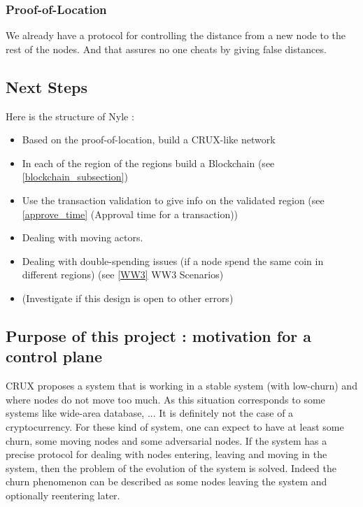 \documentclass[a4paper,11pt,oneside]{report}
\begin{document}
\subsubsection{Proof-of-Location} We already have a protocol for controlling
the distance from a new node to the rest of the nodes. And that assures no one
cheats by giving false distances. 


\subsection{Next Steps} Here is the structure of Nyle :

\begin{itemize} 
\item Based on the proof-of-location, build a CRUX-like network
\item In each of the region of the regions build a Blockchain 
(see \ref{blockchain_subsection})
\item Use the transaction validation to  give info on the validated region
(see \ref{approve_time} (Approval time for a transaction))
\item Dealing with moving actors.
\item Dealing with double-spending issues
(if a node spend the same coin in different regions) 
(see \ref{WW3} WW3 Scenarios) 
\item (Investigate if this design is open to other errors)
\end{itemize}

\subsection{Purpose of this project : motivation for a control plane}

CRUX proposes a system that is working in a stable system (with low-churn) and
where nodes do not move too much. As this situation corresponds to some
systems like wide-area database, ... It is definitely not the case of a
cryptocurrency.  For these kind of system, one can expect to have at least some
churn, some moving nodes and some adversarial nodes.  If the system has a
precise protocol for dealing with nodes entering, leaving and moving in the
system, then the problem of the evolution of the system is solved. Indeed the
churn phenomenon can be described as some nodes leaving the system and
optionally reentering later. 
\end{document}
